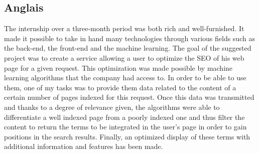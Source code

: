 \documentclass[12pt]{article}
\begin{document}
\subsection{Anglais}

The internship over a three-month period was both rich and well-furnished. It made it possible to take in hand many technologies through various fields such as the back-end, the front-end and the machine learning. The goal of the suggested project was to create a service allowing a user to optimize the SEO of his web page for a given request. This optimization was made possible by machine learning algorithms that the company had access to. In order to be able to use them, one of my tasks was to provide them data related to the content of a certain number of pages indexed for this request. Once this data was transmitted and thanks to a degree of relevance given, the algorithms were able to differentiate a well indexed page from a poorly indexed one and thus filter the content to return the terms to be integrated in the user's page in order to gain positions in the search results. Finally, an optimized display of these terms with additional information and features has been made.


\newpage
\end{document}
